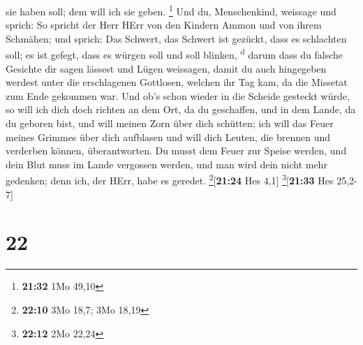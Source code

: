 sie haben soll; dem will ich sie geben. \footnote{\textbf{21:32} 1Mo
  49,10}  Und du, Menschenkind, weissage und sprich: So
spricht der Herr HErr von den Kindern Ammon und von ihrem Schmähen; und
sprich: Das Schwert, das Schwert ist gezückt, dass es schlachten soll;
es ist gefegt, dass es würgen soll und soll blinken, \textsuperscript{d}
 darum dass du falsche Gesichte dir sagen lässest und
Lügen weissagen, damit du auch hingegeben werdest unter die erschlagenen
Gottlosen, welchen ihr Tag kam, da die Missetat zum Ende gekommen war.
 Und ob's schon wieder in die Scheide gesteckt würde, so
will ich dich doch richten an dem Ort, da du geschaffen, und in dem
Lande, da du geboren bist,  und will meinen Zorn über
dich schütten; ich will das Feuer meines Grimmes über dich aufblasen und
will dich Leuten, die brennen und verderben können, überantworten.
 Du musst dem Feuer zur Speise werden, und dein Blut muss
im Lande vergossen werden, und man wird dein nicht mehr gedenken; denn
ich, der HErr, habe es geredet. \footnote{\textbf{22:10} 3Mo 18,7; 3Mo
  18,19}{[}\textbf{21:24} Hes 4,1{]} \footnote{\textbf{22:12} 2Mo 22,24}{[}\textbf{21:33}
Hes 25,2-7{]}

\hypertarget{section-21}{%
\section{22}\label{section-21}}

